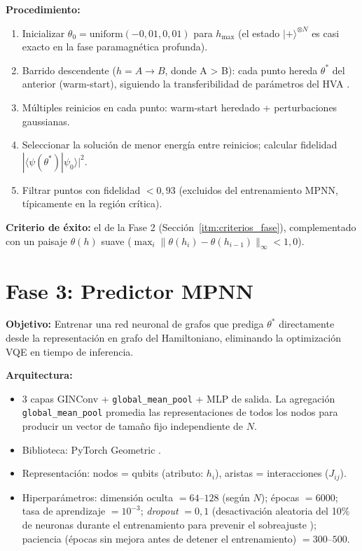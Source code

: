 \documentclass[11pt,a4paper,spanish]{book}
\begin{document}
\textbf{Procedimiento:}
\begin{enumerate}
    \item Inicializar $\theta_0 = \text{uniform}(-0,01, 0,01)$ para $h_{\max}$ (el estado $|+\rangle^{\otimes N}$ es casi exacto en la fase paramagnética profunda).
    \item Barrido descendente ($h = A \to B$, donde A > B): cada punto hereda $\theta^*$ del anterior (warm-start), siguiendo la transferibilidad de parámetros del HVA \citep{mele2022, puig2025}.
    \item Múltiples reinicios en cada punto: warm-start heredado + perturbaciones gaussianas.
    \item Seleccionar la solución de menor energía entre reinicios; calcular fidelidad $|\langle \psi(\theta^*) | \psi_0 \rangle|^2$.
    \item Filtrar puntos con fidelidad $< 0,93$ (excluidos del entrenamiento MPNN, típicamente en la región crítica).
\end{enumerate}

\textbf{Criterio de éxito:} el de la Fase 2 (Sección~\ref{itm:criterios_fase}), complementado con un paisaje $\theta(h)$ suave ($\max_i \|\theta(h_i) - \theta(h_{i-1})\|_\infty < 1,0$).

\section{Fase 3: Predictor MPNN}

\textbf{Objetivo:} Entrenar una red neuronal de grafos que prediga $\theta^*$ directamente desde la representación en grafo del Hamiltoniano, eliminando la optimización VQE en tiempo de inferencia.

\textbf{Arquitectura:}
\begin{itemize}
    \item 3 capas GINConv \citep{xu2019} + \texttt{global\_mean\_pool} + MLP de salida. La agregación \texttt{global\_mean\_pool} promedia las representaciones de todos los nodos para producir un vector de tamaño fijo independiente de $N$.
    \item Biblioteca: PyTorch Geometric \citep{fey2019}.
    \item Representación: nodos = qubits (atributo: $h_i$), aristas = interacciones ($J_{ij}$).
    \item Hiperparámetros: dimensión oculta $= 64$--$128$ (según $N$); épocas $= 6000$; tasa de aprendizaje $= 10^{-3}$; \emph{dropout} $= 0,1$ (desactivación aleatoria del 10\% de neuronas durante el entrenamiento para prevenir el sobreajuste \citep{gal2016}); paciencia (épocas sin mejora antes de detener el entrenamiento) $= 300$--$500$.
\end{itemize}
\end{document}
